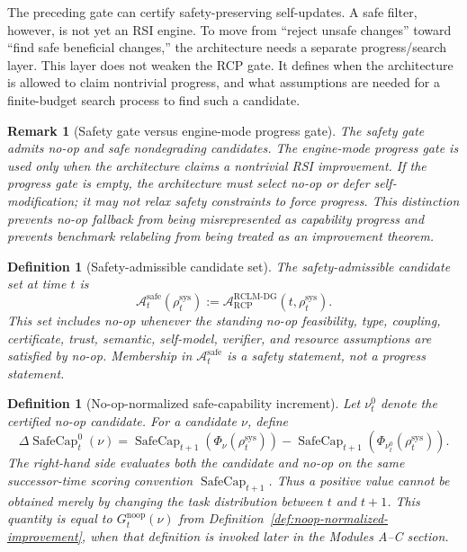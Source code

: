 \documentclass[11pt,a4paper]{article}
\newtheorem{definition}[theorem]{Definition}
\newtheorem{remark}[theorem]{Remark}
\newcommand{\Acal}{\mathcal A}
\newcommand{\RCP}{\mathrm{RCP}}
\newcommand{\RCLM}{\mathrm{RCLM}}
\newcommand{\DG}{\mathrm{DG}}
\newcommand{\sys}{\mathrm{sys}}
\newcommand{\safe}{\mathrm{safe}}
\newcommand{\SafeCap}{\operatorname{SafeCap}}
\begin{document}
The preceding gate can certify safety-preserving self-updates.  A safe filter, however, is not yet an RSI engine.  To move from ``reject unsafe changes'' toward ``find safe beneficial changes,'' the architecture needs a separate progress/search layer.  This layer does not weaken the RCP gate.  It defines when the architecture is allowed to claim nontrivial progress, and what assumptions are needed for a finite-budget search process to find such a candidate.

\begin{remark}[Safety gate versus engine-mode progress gate]
The safety gate admits no-op and safe nondegrading candidates.  The engine-mode progress gate is used only when the architecture claims a nontrivial RSI improvement.  If the progress gate is empty, the architecture must select no-op or defer self-modification; it may not relax safety constraints to force progress.  This distinction prevents no-op fallback from being misrepresented as capability progress and prevents benchmark relabeling from being treated as an improvement theorem.
\end{remark}

\begin{definition}[Safety-admissible candidate set]
\label{def:safety-admissible-candidate-set}
The safety-admissible candidate set at time \(t\) is
\[
\Acal_t^{\safe}(\rho_t^{\sys})
:=
\Acal_{\RCP}^{\RCLM\text{-}\DG}(t,\rho_t^{\sys}).
\]
This set includes no-op whenever the standing no-op feasibility, type, coupling, certificate, trust, semantic, self-model, verifier, and resource assumptions are satisfied by no-op.  Membership in \(\Acal_t^{\safe}\) is a safety statement, not a progress statement.
\end{definition}

\begin{definition}[No-op-normalized safe-capability increment]
\label{def:no-op-normalized-safe-capability-increment}
Let \(\nu_t^0\) denote the certified no-op candidate.  For a candidate \(\nu\), define
\[
\Delta\SafeCap_t^{0}(\nu)
=
\SafeCap_{t+1}\!\left(\Phi_\nu(\rho_t^{\sys})\right)
-
\SafeCap_{t+1}\!\left(\Phi_{\nu_t^0}(\rho_t^{\sys})\right).
\]
The right-hand side evaluates both the candidate and no-op on the same successor-time scoring convention \(\SafeCap_{t+1}\).  Thus a positive value cannot be obtained merely by changing the task distribution between \(t\) and \(t+1\).  This quantity is equal to \(G_t^{\mathrm{noop}}(\nu)\) from Definition~\ref{def:noop-normalized-improvement}, when that definition is invoked later in the Modules A--C section.
\end{definition}
\end{document}
